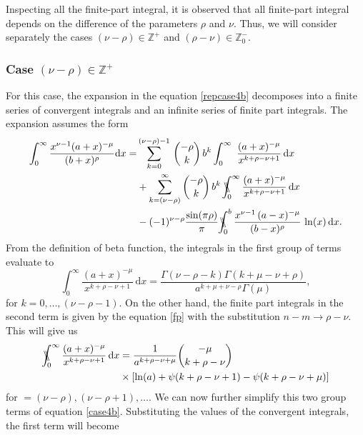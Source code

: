 Inspecting all the finite-part integral, it is observed that all finite-part integral depends on the difference of the parameters $\rho$ and $\nu$. Thus,  we will consider separately the cases $(\nu-\rho) \in \mathbb{Z}^{+}$ and $(\rho-\nu) \in \mathbb{Z}_{0}^{-}$.  

\subsubsection{Case $(\nu-\rho) \in \mathbb{Z}^{+}$}

For this case, the expansion in the equation \eqref{repcase4b} decomposes into a finite series of convergent integrals and an infinite series of finite part integrals. The expansion assumes the form
\begin{equation}
\begin{split} 
\int_0^{\infty} \frac{x^{\nu-1} (a+x)^{-\mu}}{(b+x)^{\rho}} \mathrm{d}x  = &  \sum_{k=0}^{(\nu-\rho)-1} \, {- \rho \choose k} \, b^{k} \int_0^{\infty} \ \frac{(a+x)^{-\mu}}{x^{k+\rho-\nu+1}} \,\mathrm{d}x \\& + \sum_{k=(\nu-\rho)}^{\infty} {- \rho \choose k} \, b^{k} \, \bbint{0}{\infty} \frac{(a+x)^{-\mu}}{x^{k+\rho-\nu+1}} \,\mathrm{d}x
\\&- (-1)^{\nu-\rho}\frac{\sin(\pi\rho)}{\pi} \bbint{0}{b} \frac{x^{\nu-1} \, (a-x)^{-\mu}}{(b-x)^{\rho}} \, \ln(x)\, \mathrm{d}x.
\label{case4b}
\end{split}
\end{equation}
From the definition of beta function, the integrals in the first group of terms evaluate to
\begin{equation}
    \int_0^{\infty} \frac{(a+x)^{-\mu}}{x^{k+\rho-\nu+1}}\,\mathrm{d}x = \frac{\Gamma(\nu-\rho-k)\Gamma(k+\mu-\nu+\rho)}{a^{k+\mu+\nu-\rho} \Gamma(\mu)},
\end{equation}
for $k=0, \dots, (\nu-\rho-1)$. On the other hand, the finite part integrals in the second term is given by the equation \eqref{fp} with the substitution $n-m \to \rho-\nu$. This will give us
\begin{equation}
\begin{split} \label{second}
    \bbint{0}{\infty} \frac{(a+x)^{-\mu}}{x^{k+\rho-\nu+1}} \,\mathrm{d}x &= \frac{1}{a^{k+\rho-\nu+\mu}} {-\mu \choose k+\rho-\nu} \\
    &\times\left[\ln(a) + \psi(k+\rho-\nu+1)-\psi(k+\rho-\nu+\mu)\right]
    \end{split}
\end{equation}
for $=(\nu-\rho), (\nu-\rho+1),\dots$. We can now further simplify this two group terms of equation \eqref{case4b}. Substituting the values of the convergent integrals, the first term will become
